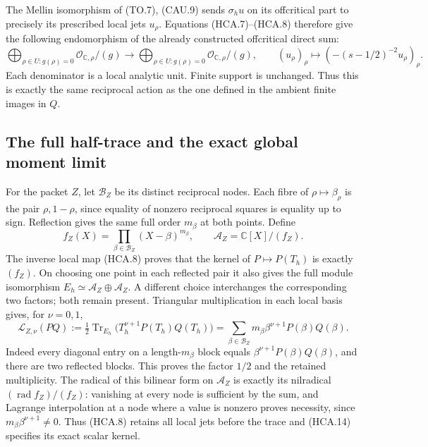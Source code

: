 The Mellin isomorphism of (TO.7), (CAU.9) sends $\sigma_hu$
on its offcritical part to precisely its prescribed local jets
$u_\rho$. Equations (HCA.7)--(HCA.8) therefore give the following
endomorphism of the already constructed offcritical direct sum:
\[
 \bigoplus_{\rho\in U:g(\rho)=0}
       \mathcal O_{\mathbb{C},\rho}/(g)
 \longrightarrow
 \bigoplus_{\rho\in U:g(\rho)=0}
       \mathcal O_{\mathbb{C},\rho}/(g),\qquad
 (u_\rho)_\rho\longmapsto
       (-(s-1/2)^{-2}u_\rho)_\rho.
 \tag{HCA.12}
\]
Each denominator is a local analytic unit. Finite support is
unchanged. Thus this is exactly the same reciprocal action as
the one defined in the ambient finite images in $Q$.

\subsection{The full half-trace and the exact global moment limit}

For the packet $Z$, let $\mathcal B_Z$ be its distinct reciprocal
nodes. Each fibre of $\rho\mapsto\beta_\rho$ is the pair
$\rho,1-\rho$, since equality of nonzero reciprocal squares is
equality up to sign. Reflection gives the same full order $m_\beta$
at both points. Define
\[
 f_Z(X)=\prod_{\beta\in\mathcal B_Z}(X-\beta)^{m_\beta},
 \qquad\mathcal A_Z=\mathbb{C}[X]/(f_Z).
 \tag{HCA.13}
\]
The inverse local map (HCA.8) proves that the kernel of
$P\mapsto P(T_h)$ is exactly $(f_Z)$. On choosing one point
in each reflected pair it also gives the full module isomorphism
$E_h\simeq\mathcal A_Z\oplus\mathcal A_Z$. A different choice
interchanges the corresponding two factors; both remain present.
Triangular multiplication in each local basis gives, for $\nu=0,1$,
\[
 \mathcal L_{Z,\nu}(PQ)
 :=\tfrac12\operatorname{Tr}_{E_h}
          \bigl(T_h^{\nu+1}P(T_h)Q(T_h)\bigr)
 =\sum_{\beta\in\mathcal B_Z}m_\beta\beta^{\nu+1}P(\beta)Q(\beta).
 \tag{HCA.14}
\]
Indeed every diagonal entry on a length-$m_\beta$ block equals
$\beta^{\nu+1}P(\beta)Q(\beta)$, and there are two reflected
blocks. This proves the factor $1/2$ and the retained multiplicity.
The radical of this bilinear form on $\mathcal A_Z$ is exactly
its nilradical $(\operatorname{rad}f_Z)/(f_Z)$: vanishing at
every node is sufficient by the sum, and Lagrange interpolation
at a node where a value is nonzero proves necessity, since
$m_\beta\beta^{\nu+1}\ne0$. Thus (HCA.8) retains all local
jets before the trace and (HCA.14) specifies its exact scalar kernel.

